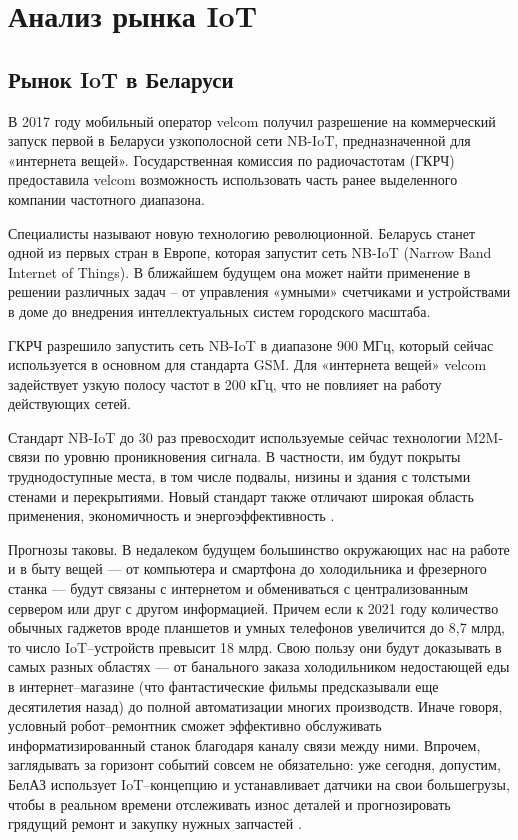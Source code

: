 \section{Анализ рынка IoT}
\label{sec:analysis}

\subsection{Рынок IoT в Беларуси}
\label{sec:analysis:belarus}

В 2017 году мобильный оператор velcom получил разрешение на коммерческий запуск первой в Беларуси узкополосной сети NB-IoT, предназначенной для «интернета вещей». Государственная комиссия по радиочастотам (ГКРЧ) предоставила velcom возможность использовать часть ранее выделенного компании частотного диапазона.

Специалисты называют новую технологию революционной. Беларусь станет одной из первых стран в Европе, которая запустит сеть NB-IoT (Narrow Band Internet of Things). В ближайшем будущем она может найти применение в решении различных задач – от управления «умными» счетчиками и устройствами в доме до внедрения интеллектуальных систем городского масштаба.

ГКРЧ разрешило запустить сеть NB-IoT в диапазоне 900 МГц, который сейчас используется в основном для стандарта GSM. Для «интернета вещей» velcom задействует узкую полосу частот в 200 кГц, что не повлияет на работу действующих сетей.

Стандарт NB-IoT до 30 раз превосходит используемые сейчас технологии M2M-связи по уровню проникновения сигнала. В частности, им будут покрыты труднодоступные места, в том числе подвалы, низины и здания с толстыми стенами и перекрытиями. Новый стандарт также отличают широкая область применения, экономичность и энергоэффективность \cite{iot_belarus_velcom}.

Прогнозы таковы. В недалеком будущем большинство окружающих нас на работе и в быту вещей — от компьютера и смартфона до холодильника и фрезерного станка — будут связаны с интернетом и обмениваться с централизованным сервером или друг с другом информацией. Причем если к 2021 году количество обычных гаджетов вроде планшетов и умных телефонов увеличится до 8,7 млрд, то число IoT–устройств превысит 18 млрд. Свою пользу они будут доказывать в самых разных областях — от банального заказа холодильником недостающей еды в интернет–магазине (что фантастические фильмы предсказывали еще десятилетия назад) до полной автоматизации многих производств. Иначе говоря, условный робот–ремонтник сможет эффективно обслуживать информатизированный станок благодаря каналу связи между ними. Впрочем, заглядывать за горизонт событий совсем не обязательно: уже сегодня, допустим, БелАЗ использует IoT–концепцию и устанавливает датчики на свои большегрузы, чтобы в реальном времени отслеживать износ деталей и прогнозировать грядущий ремонт и закупку нужных запчастей \cite{iot_belarus_prog}.

